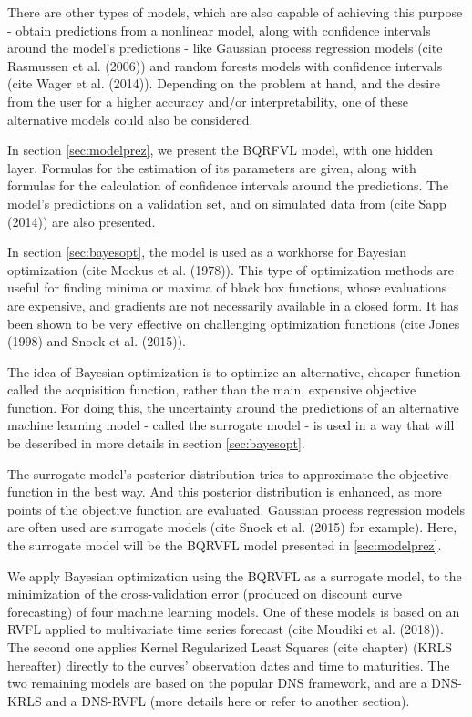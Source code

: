 \medskip 

There are other types of models, which are also capable of achieving this purpose - obtain predictions from a nonlinear model, along with confidence intervals around the model's predictions - like Gaussian process regression models (cite Rasmussen et al. (2006)) and random forests models with confidence intervals (cite Wager et al. (2014)). Depending on the problem at hand, and the desire from the user for a higher  accuracy and/or interpretability, one of these alternative models could also be considered.    

\medskip 

In section \ref{sec:modelprez}, we present the BQRFVL model, with one hidden layer. Formulas for the estimation of its parameters are given, along with formulas for the calculation of confidence intervals around the predictions. The model's predictions on a validation set, and on simulated data from (cite Sapp (2014)) are also presented. 

\medskip 

In section \ref{sec:bayesopt}, the model is used as a workhorse for Bayesian optimization (cite Mockus et al. (1978)). This type of optimization methods are useful for finding minima or maxima of black box functions, whose evaluations are expensive, and gradients are not necessarily available in a closed form. It has been shown to be very effective on challenging optimization functions (cite Jones (1998) and Snoek et al. (2015)).

\medskip 

The idea of Bayesian optimization is to optimize an alternative, cheaper function called the acquisition function, rather than the main, expensive objective function. For doing this, the uncertainty around the predictions of an alternative machine learning model - called the surrogate model - is used in a way that will be described in more details in section \ref{sec:bayesopt}. 

\medskip 

The surrogate model's posterior distribution tries to approximate the objective function in the best way. And this posterior distribution is enhanced, as more points of the objective function are evaluated. Gaussian process regression models are often used are surrogate models (cite Snoek et al. (2015) for example). Here, the surrogate model will be the BQRVFL model presented in \ref{sec:modelprez}.

\medskip 

We apply Bayesian optimization using the BQRVFL as a surrogate model, to the minimization of the cross-validation error (produced on discount curve forecasting) of four machine learning models. One of these models is based on an RVFL applied to multivariate time series forecast (cite Moudiki et al. (2018)). The second one applies Kernel Regularized Least Squares (cite chapter) (KRLS hereafter) directly to the curves' observation dates and time to maturities. The two remaining models are based on the popular DNS framework, and are a DNS-KRLS and a DNS-RVFL (more details here or refer to another section). 

